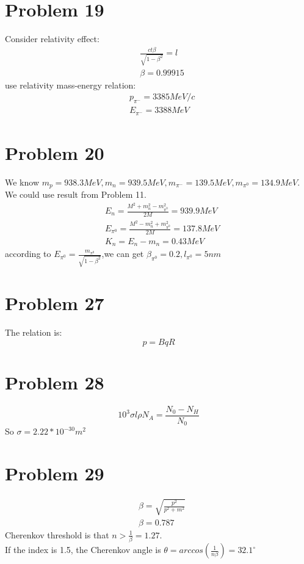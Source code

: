 \documentclass{article}
\begin{document}
\begin{CJK*}{GBK}{song}
\section{Problem 19}
Consider relativity effect:
\begin{equation}
\begin{aligned}
&\frac{ct\beta}{\sqrt{1-\beta^2}}=l\\
&\beta=0.99915
\end{aligned}
\end{equation}
use relativity mass-energy relation:
\begin{equation}
\begin{aligned}
&p_{\pi^-}=3385MeV/c\\
&E_{\pi^-}=3388MeV
\end{aligned}
\end{equation}


\section{Problem 20}
We know $m_p=938.3MeV, m_n=939.5MeV, m_{\pi^-}=139.5MeV, m_{\pi^0}=134.9MeV. $\\
We could use result from Problem 11.
\begin{equation}
\begin{aligned}
&E_{n}=\frac{M^2+m_n^2-m_{\pi^0}^2}{2M}=939.9MeV\\
&E_{\pi^0}=\frac{M^2-m_n^2+m_{\pi^0}^2}{2M}=137.8MeV\\
&K_{n}=E_{n}-m_n=0.43MeV
\end{aligned}
\end{equation}
according to $E_{\pi^0}=\frac{m_{\pi^0}}{\sqrt{1-\beta^2}}$,we can get $\beta_{\pi^0}=0.2,l_{\pi^0}=5nm$

\section{Problem 27}
The relation is:
\begin{equation}
p=BqR
\end{equation}


\section{Problem 28}
\begin{equation}
10^3\sigma l \rho N_A=\frac{N_0-N_H}{N_0}
\end{equation}
So $\sigma=2.22*10^{-30}m^2$


\section{Problem 29}
\begin{equation}
\begin{aligned}
&\beta=\sqrt{\frac{p^2}{p^2+m^2}}\\
&\beta=0.787
\end{aligned}
\end{equation}
Cherenkov threshold is that $n>\frac{1}{\beta}=1.27$.\\
If the index is 1.5, the Cherenkov angle is $\theta=arccos(\frac{1}{n\beta})=32.1^{\circ}$


\end{CJK*}
\end{document}
